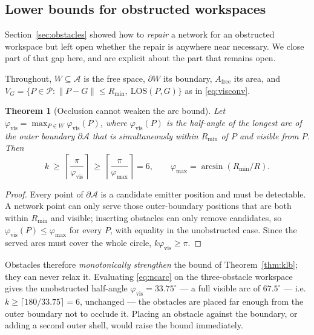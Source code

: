 \documentclass[journal,10pt]{IEEEtran}
\newtheorem{theorem}{Theorem}
\theoremstyle{definition}
\newenvironment{bproof}{\begin{proof}}{\end{proof}}
\newcommand{\Rmin}{R_{\min}}
\newcommand{\bA}{\mathcal{A}}
\newcommand{\bP}{\mathcal{P}}
\begin{document}
\subsection{Lower bounds for obstructed workspaces}
\label{sec:ncbounds}

Section~\ref{sec:obstacles} showed how to \emph{repair} a network for an obstructed workspace but
left open whether the repair is anywhere near necessary. We close part of that gap here, and are
explicit about the part that remains open.

Throughout, $W\subseteq\bA$ is the free space, $\partial W$ its boundary, $A_{\mathrm{free}}$ its
area, and $V_G=\{P\in\bP:\|P-G\|\le\Rmin,\ \mathrm{LOS}(P,G)\}$ as in \eqref{eq:visconv}.

\begin{theorem}[Occlusion cannot weaken the arc bound]
\label{thm:ncarc}
Let $\varphi_{\mathrm{vis}}=\max_{P\in W}\varphi_{\mathrm{vis}}(P)$, where
$\varphi_{\mathrm{vis}}(P)$ is the half-angle of the longest arc of the outer boundary
$\partial\bA$ that is simultaneously within $\Rmin$ of $P$ and visible from $P$. Then
\begin{equation}
k\ \ge\ \left\lceil\frac{\pi}{\varphi_{\mathrm{vis}}}\right\rceil
\ \ge\ \left\lceil\frac{\pi}{\varphi_{\max}}\right\rceil=6,
\qquad \varphi_{\max}=\arcsin(\Rmin/R).
\label{eq:ncarc}
\end{equation}
\end{theorem}
\begin{bproof}
Every point of $\partial\bA$ is a candidate emitter position and must be detectable. A network
point can only serve those outer-boundary positions that are both within $\Rmin$ and visible;
inserting obstacles can only remove candidates, so $\varphi_{\mathrm{vis}}(P)\le\varphi_{\max}$
for every $P$, with equality in the unobstructed case. Since the served arcs must cover the whole
circle, $k\varphi_{\mathrm{vis}}\ge\pi$.
\end{bproof}

Obstacles therefore \emph{monotonically strengthen} the bound of Theorem~\ref{thm:klb}; they can
never relax it. Evaluating \eqref{eq:ncarc} on the three-obstacle workspace gives the unobstructed
half-angle $\varphi_{\mathrm{vis}}=33.75^\circ$ --- a full visible arc of $67.5^\circ$ ---
i.e. $k\ge\lceil180/33.75\rceil=6$, unchanged --- the obstacles are placed far
enough from the outer boundary not to occlude it. Placing an obstacle against the boundary, or
adding a second outer shell, would raise the bound immediately.
\end{document}
